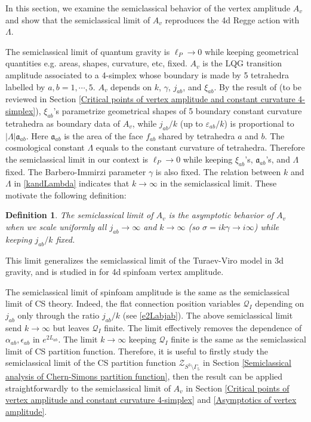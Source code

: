 \documentclass[aps,prd,notitlepage,nofootinbib,superscriptaddress,groupedaddress,twocolumn]{revtex4-1}
\newtheorem{definition}{Definition}[section]
\newcommand{\cz}{\mathcal Z}
\newcommand{\scrq}{\mathscr{Q}}
\newcommand{\fa}{\mathfrak{a}}  \newcommand{\Fa}{\mathfrak{A}}
\renewcommand{\a}{\alpha}
\newcommand{\g}{\gamma}
\newcommand{\G}{\Gamma}
\newcommand{\eps}{\varepsilon}
\newcommand{\sig}{\sigma}
\renewcommand{\L }{\Lambda}
\begin{document}
In this section, we examine the semiclassical behavior of the vertex amplitude $A_v$ and show that the semiclassical limit of $A_v$ reproduces the 4d Regge action with $\L$. 

The semiclassical limit of quantum gravity is $\ell_P\to 0$ while keeping geometrical quantities e.g. areas, shapes, curvature, etc, fixed. $A_v$ is the LQG transition amplitude associated to a 4-simplex whose boundary is made by 5 tetrahedra labelled by $a,b=1,\cdots,5$. $A_v$ depends on $k$, $\g$, $j_{ab}$, and $\xi_{ab}$. By the result of \cite{curvedMink} (to be reviewed in Section \ref{Critical points of vertex amplitude and constant curvature 4-simplex}), $\xi_{ab}$'s parametrize geometrical shapes of 5 boundary constant curvature tetrahedra as boundary data of $A_v$, while $j_{ab}/k$ (up to $\eps_{ab}/k$) is proportional to $|\L|\fa_{ab}$. Here $\fa_{ab}$ is the area of the face $f_{ab}$ shared by tetrahedra $a$ and $b$. The cosmological constant $\L$ equals to the constant curvature of tetrahedra. Therefore the semiclassical limit in our context is $\ell_P\to 0$ while keeping $\xi_{ab}$'s, $\fa_{ab}$'s, and $\L$ fixed. The Barbero-Immirzi parameter $\g$ is also fixed. The relation between $k$ and $\L$ in \eqref{kandLambda} indicates that $k\to \infty$ in the semiclassical limit. These motivate the following definition:

\begin{definition}

The semiclassical limit of $A_v$ is the asymptotic behavior of $A_v$ when we scale uniformly all $j_{ab}\to\infty$ and $k\to \infty$ (so $\sig=ik\g\to i\infty$) while keeping $j_{ab}/k$ fixed.

\end{definition}

This limit generalizes the semiclassical limit of the Turaev-Viro model in 3d gravity, and is studied in \cite{HHKR} for 4d spinfoam vertex amplitude. 

The semiclassical limit of spinfoam amplitude is the same as the semiclassical limit of CS theory. Indeed, the flat connection position variables $\scrq_I$ depending on $j_{ab}$ only through the ratio $j_{ab}/k$ (see \eqref{e2Labjab}). The above semiclassical limit send $k\to\infty$ but leaves $\scrq_I$ finite. The limit effectively removes the dependence of $\a_{ab},\epsilon_{ab}$ in $e^{2L_{ab}}$. The limit $k\to\infty$ keeping $\scrq_I$ finite is the same as the semiclassical limit of CS partition function. Therefore, it is useful to firstly study the semiclassical limit of the CS partition function $\cz_{S^3\setminus\G_5}$ in Section \ref{Semiclassical analysis of Chern-Simons partition function}, then the result can be applied straightforwardly to the semiclassical limit of $A_v$ in Section \ref{Critical points of vertex amplitude and constant curvature 4-simplex} and \ref{Asymptotics of vertex amplitude}.
\end{document}
